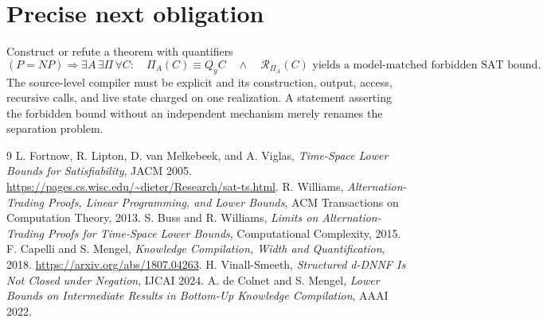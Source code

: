 \documentclass[11pt]{article}
\begin{document}
\section{Precise next obligation}
Construct or refute a theorem with quantifiers
\[
(P=NP)\Longrightarrow
\exists A\,\exists\Pi\,\forall C:
\quad \Pi_A(C)\equiv Q_yC
\quad\land\quad
\mathcal R_{\Pi_A}(C)\text{ yields a model-matched forbidden SAT bound}.
\]
The source-level compiler must be explicit and its construction,
output, access, recursive calls, and live state charged on one
realization. A statement asserting the forbidden bound without an
independent mechanism merely renames the separation problem.

\begin{thebibliography}{9}
 L. Fortnow, R. Lipton, D. van Melkebeek, and A. Viglas,
\emph{Time-Space Lower Bounds for Satisfiability}, JACM 2005.
\url{https://pages.cs.wisc.edu/~dieter/Research/sat-ts.html}.
 R. Williams,
\emph{Alternation-Trading Proofs, Linear Programming, and Lower Bounds},
ACM Transactions on Computation Theory, 2013.
 S. Buss and R. Williams,
\emph{Limits on Alternation-Trading Proofs for Time-Space Lower Bounds},
Computational Complexity, 2015.
 F. Capelli and S. Mengel,
\emph{Knowledge Compilation, Width and Quantification}, 2018.
\url{https://arxiv.org/abs/1807.04263}.
 H. Vinall-Smeeth,
\emph{Structured d-DNNF Is Not Closed under Negation}, IJCAI 2024.
 A. de Colnet and S. Mengel,
\emph{Lower Bounds on Intermediate Results in Bottom-Up Knowledge Compilation},
AAAI 2022.
\end{thebibliography}
\end{document}
